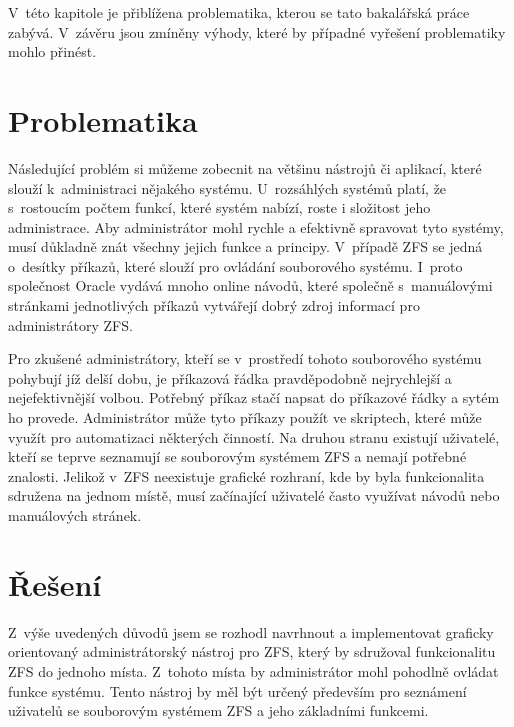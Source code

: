 V~této kapitole je přiblížena problematika, kterou se tato bakalářská práce zabývá. V~závěru jsou zmíněny výhody, které by případné vyřešení problematiky mohlo přinést.

\section{Problematika}
Následující problém si můžeme zobecnit na většinu nástrojů či aplikací, které slouží k~administraci nějakého systému. U~rozsáhlých systémů platí, že s~rostoucím počtem funkcí, které systém nabízí, roste i složitost jeho administrace. Aby administrátor mohl rychle a efektivně spravovat tyto systémy, musí důkladně znát všechny jejich funkce a principy. V~případě ZFS se jedná o~desítky příkazů, které slouží pro ovládání souborového systému. I~proto společnost Oracle vydává mnoho online návodů, které společně s~manuálovými stránkami jednotlivých příkazů vytvářejí dobrý zdroj informací pro administrátory ZFS.

Pro zkušené administrátory, kteří se v~prostředí tohoto souborového systému pohybují jíž delší dobu, je příkazová řádka pravděpodobně nejrychlejší a nejefektivnější volbou. Potřebný příkaz stačí napsat do příkazové řádky a sytém ho provede. Administrátor může tyto příkazy použít ve skriptech, které může využít pro automatizaci některých činností. Na druhou stranu existují uživatelé, kteří se teprve seznamují se souborovým systémem ZFS a nemají potřebné znalosti. Jelikož v~ZFS neexistuje grafické rozhraní, kde by byla funkcionalita sdružena na jednom místě, musí začínající uživatelé často využívat návodů nebo manuálových stránek.
\section{Řešení}
Z~výše uvedených důvodů jsem se rozhodl navrhnout a implementovat graficky orientovaný administrátorský nástroj pro ZFS, který by sdružoval funkcionalitu ZFS do jednoho místa. Z~tohoto místa by administrátor mohl pohodlně ovládat funkce systému. Tento nástroj by měl být určený především pro seznámení uživatelů se souborovým systémem ZFS a jeho základními funkcemi.

